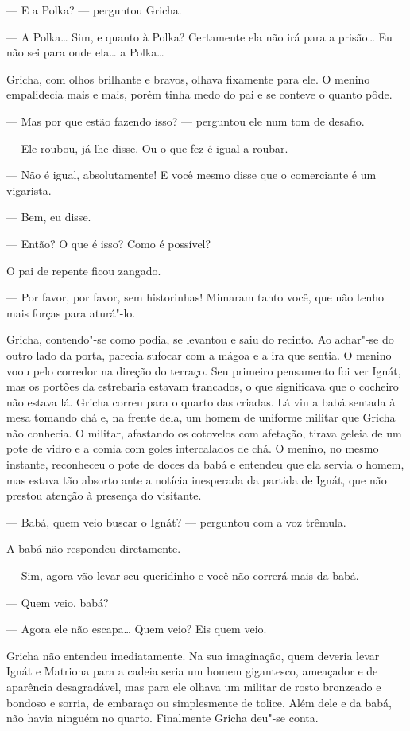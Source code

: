 --- E a Polka? --- perguntou Gricha.

--- A Polka\ldots{} Sim, e quanto à Polka? Certamente ela não irá para a
prisão\ldots{} Eu não sei para onde ela\ldots{} a Polka\ldots{}

Gricha, com olhos brilhante e bravos, olhava fixamente para ele. O
menino empalidecia mais e mais, porém tinha medo do pai e se conteve o
quanto pôde.

--- Mas por que estão fazendo isso? --- perguntou ele num tom de
desafio.

--- Ele roubou, já lhe disse. Ou o que fez é igual a roubar.

--- Não é igual, absolutamente! E você mesmo disse que o comerciante é
um vigarista.

--- Bem, eu disse.

--- Então? O que é isso? Como é possível?

O pai de repente ficou zangado.

--- Por favor, por favor, sem historinhas! Mimaram tanto você, que não
tenho mais forças para aturá"-lo.

Gricha, contendo"-se como podia, se levantou e saiu do recinto. Ao achar"-se
do outro lado da porta, parecia sufocar com a mágoa e a ira que sentia.
O menino voou pelo corredor na direção do terraço. Seu primeiro
pensamento foi ver Ignát, mas os portões da estrebaria estavam
trancados, o que significava que o cocheiro não estava lá. Gricha correu
para o quarto das criadas. Lá viu a babá sentada à mesa tomando chá e,
na frente dela, um homem de uniforme militar que Gricha não conhecia. O
militar, afastando os cotovelos com afetação, tirava geleia de um pote
de vidro e a comia com goles intercalados de chá. O menino, no mesmo
instante, reconheceu o pote de doces da babá e entendeu que ela servia o
homem, mas estava tão absorto ante a notícia inesperada da partida de
Ignát, que não prestou atenção à presença do visitante.

--- Babá, quem veio buscar o Ignát? --- perguntou com a voz trêmula.

A babá não respondeu diretamente.

--- Sim, agora vão levar seu queridinho e você não correrá mais da babá.

--- Quem veio, babá?

--- Agora ele não escapa\ldots{} Quem veio? Eis quem veio.

Gricha não entendeu imediatamente. Na sua imaginação, quem deveria levar
Ignát e Matriona para a cadeia seria um homem gigantesco, ameaçador e de
aparência desagradável, mas para ele olhava um militar de rosto
bronzeado e bondoso e sorria, de embaraço ou simplesmente de tolice.
Além dele e da babá, não havia ninguém no quarto. Finalmente Gricha
deu"-se conta.

